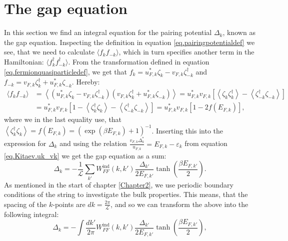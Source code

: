 \section{The gap equation} \label{sec.pairingpotential.integralequation}
In this section we find an integral equation for the pairing potential $\Delta_k$, known as the gap equation. Inspecting the definition in equation \eqref{eq.pairingpotentialdef} we see, that we need to calculate $\langle f_k f_{-k} \rangle$, which in turn specifies another term in the Hamiltonian: $\langle f^\dagger_k f^\dagger_{-k} \rangle$. From the transformation defined in equation \eqref{eq.fermionquasiparticledef}, we get that $f_k = u^*_{F,k}\zeta_k - v_{F,k}\zeta^\dagger_{-k}$ and $f_{-k} = v_{F,k}\zeta^\dagger_k + u^*_{F,k}\zeta_{-k}$. Hereby:
\begin{align}
\langle f_k f_{-k} \rangle &= \left \langle (u^*_{F,k}\zeta_k - v_{F,k}\zeta^\dagger_{-k}) (v_{F,k}\zeta^\dagger_k + u^*_{F,k}\zeta_{-k}) \right \rangle = u^*_{F,k}v_{F,k}\left[ \left \langle \zeta_k \zeta^\dagger_{k} \right \rangle - \left \langle \zeta^\dagger_{-k} \zeta_{-k} \right \rangle \right]  \nonumber \\
& =  u^*_{F,k}v_{F,k}\left[ 1 - \left \langle \zeta^\dagger_{k} \zeta_k \right \rangle - \left \langle \zeta^\dagger_{-k} \zeta_{-k} \right \rangle \right] = u^*_{F,k}v_{F,k}\left[1 - 2f(E_{F,k})\right], \nonumber
\end{align}
where we in the last equality use, that $\left \langle \zeta^\dagger_{k} \zeta_{k} \right \rangle = f(E_{F,k})=(\exp(\beta E_{F,k})+1)^{-1} $. Inserting this into the expression for $\Delta_k$ and using the relation $\frac{v_{F,k}\Delta^*_k}{u_{F,k}}=E_{F,k}-\varepsilon_k$ from equation \eqref{eq.Kitaev.uk_vk} we get the gap equation as a sum:
\begin{equation}
\Delta_k = - \frac{1}{\mathcal{L}}\sum_{k'} W^\text{ind}_{FF}(k,k')\frac{\Delta_{k'}}{2E_{F,k'}}\tanh\left(\frac{\beta E_{F,k'}}{2}\right).
\label{eq.GapequationSum}
\end{equation} 
As mentioned in the start of chapter \ref{Chapter2}, we use periodic boundary conditions of the string to investigate the bulk properties. This means, that the spacing of the $k$-points are $dk = \frac{2\pi}{\mathcal{L}}$, and so we can transform the above into the following integral:
\begin{equation}
\Delta_k = - \int \frac{dk'}{2\pi} W^\text{ind}_{FF}(k,k')\frac{\Delta_{k'}}{2E_{F,k'}}\tanh\left(\frac{\beta E_{F,k'}}{2}\right), 
\label{eq.GapequationIntegral}
\end{equation} 

